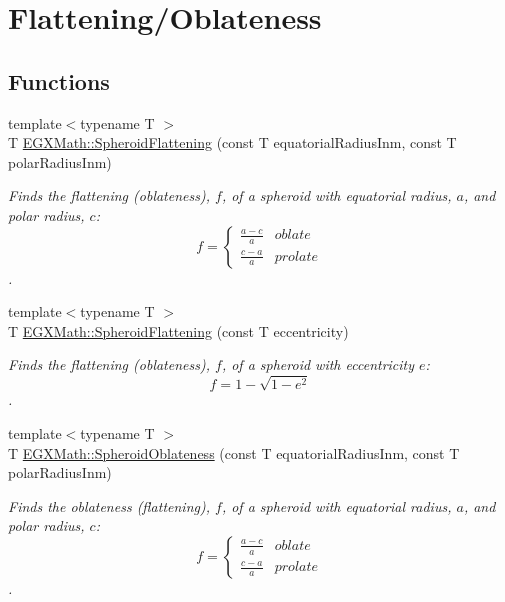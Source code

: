 \hypertarget{group___e_g_x_math-_geometry-3_d-_spheroid-_flattening}{}\section{Flattening/\+Oblateness}
\label{group___e_g_x_math-_geometry-3_d-_spheroid-_flattening}
\subsection*{Functions}
\begin{DoxyCompactItemize}
\item 
{\footnotesize template$<$typename T $>$ }\\T \mbox{\hyperlink{group___e_g_x_math-_geometry-3_d-_spheroid-_flattening_ga05e3be91f5f7fbaa9371687aa3834179}{E\+G\+X\+Math\+::\+Spheroid\+Flattening}} (const T equatorial\+Radius\+Inm, const T polar\+Radius\+Inm)
\begin{DoxyCompactList}\small\item\em Finds the flattening (oblateness), $f$, of a spheroid with equatorial radius, $a$, and polar radius, $c$\+: \[ f =\begin{cases} \frac{a-c}{a}{} & oblate \\ \frac{c-a}{a} & prolate \end{cases} \]. \end{DoxyCompactList}\item 
{\footnotesize template$<$typename T $>$ }\\T \mbox{\hyperlink{group___e_g_x_math-_geometry-3_d-_spheroid-_flattening_ga9822b6e1025edbf7d272949547c53511}{E\+G\+X\+Math\+::\+Spheroid\+Flattening}} (const T eccentricity)
\begin{DoxyCompactList}\small\item\em Finds the flattening (oblateness), $f$, of a spheroid with eccentricity $e$\+: \[ f = 1 - \sqrt{1-e^2} \]. \end{DoxyCompactList}\item 
{\footnotesize template$<$typename T $>$ }\\T \mbox{\hyperlink{group___e_g_x_math-_geometry-3_d-_spheroid-_flattening_ga9769747e144e2209b7927632b854c31f}{E\+G\+X\+Math\+::\+Spheroid\+Oblateness}} (const T equatorial\+Radius\+Inm, const T polar\+Radius\+Inm)
\begin{DoxyCompactList}\small\item\em Finds the oblateness (flattening), $f$, of a spheroid with equatorial radius, $a$, and polar radius, $c$\+: \[ f =\begin{cases} \frac{a-c}{a}{} & oblate \\ \frac{c-a}{a} & prolate \end{cases} \]. \end{DoxyCompactList}\item 

\end{DoxyCompactItemize}
